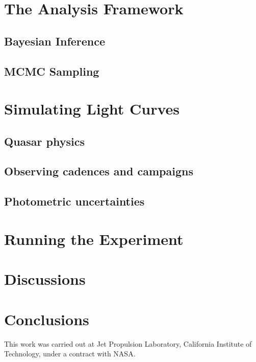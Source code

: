 \documentclass{emulateapj}
\begin{document}
\section{The Analysis Framework}\label{}
\subsection{Bayesian Inference}\label{}
\subsection{MCMC Sampling}\label{}

\section{Simulating Light Curves}\label{}
\subsection{Quasar physics}\label{}
\subsection{Observing cadences and campaigns}\label{}
\subsection{Photometric uncertainties}\label{}

\section{Running the Experiment}\label{}


\section{Discussions}\label{sec:disc}

\section{Conclusions}\label{sec:conc}

\acknowledgements

This work was carried out at Jet Propulsion Laboratory, California
Institute of Technology, under a contract with NASA.



\end{document}
